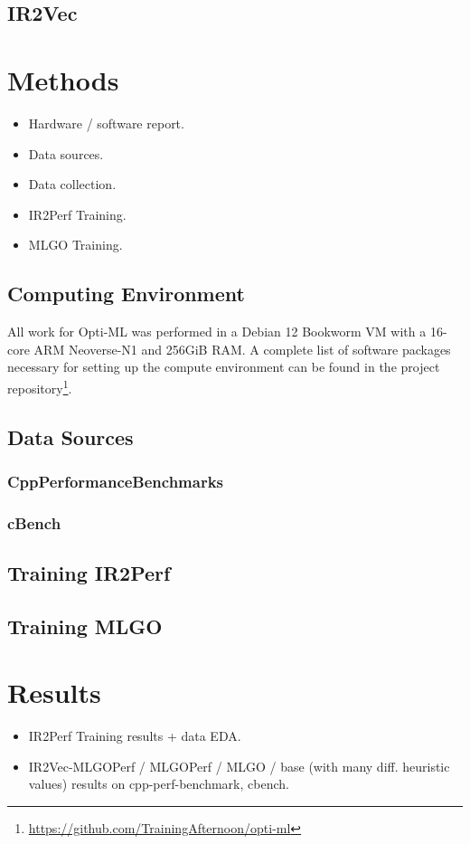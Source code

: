 \documentclass[nohyperref]{article}
\theoremstyle{plain}
\theoremstyle{definition}
\theoremstyle{remark}
\begin{document}
\subsection{IR2Vec}

\section{Methods}
\label{methods}
\begin{itemize}
\item Hardware / software report\@.
\item Data sources\@.
\item Data collection\@.
\item IR2Perf Training\@.
\item MLGO Training\@.
\end{itemize}

\subsection{Computing Environment}
All work for Opti-ML was performed in a Debian 12 Bookworm VM with a 16-core ARM Neoverse-N1 and 256GiB RAM. A complete list of software packages necessary for setting up the compute environment can be found in the project repository\footnote{\href{https://github.com/TrainingAfternoon/opti-ml}{https://github.com/TrainingAfternoon/opti-ml}}.

\subsection{Data Sources}
\subsubsection{CppPerformanceBenchmarks}
\subsubsection{cBench}

\subsection{Training IR2Perf}

\subsection{Training MLGO}

\section{Results}
\label{results}
\begin{itemize}
\item IR2Perf Training results + data EDA\@.
\item IR2Vec-MLGOPerf / MLGOPerf / MLGO / base (with many diff. heuristic values) results on cpp-perf-benchmark, cbench\@.
\end{itemize}
\end{document}
